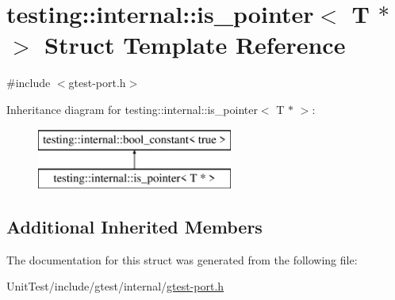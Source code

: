 \hypertarget{structtesting_1_1internal_1_1is__pointer_3_01_t_01_5_01_4}{\section{testing\+:\+:internal\+:\+:is\+\_\+pointer$<$ T $\ast$ $>$ Struct Template Reference}
\label{structtesting_1_1internal_1_1is__pointer_3_01_t_01_5_01_4}
}


{\ttfamily \#include $<$gtest-\/port.\+h$>$}

Inheritance diagram for testing\+:\+:internal\+:\+:is\+\_\+pointer$<$ T $\ast$ $>$\+:\begin{figure}[H]
\begin{center}
\leavevmode
\includegraphics[height=2.000000cm]{structtesting_1_1internal_1_1is__pointer_3_01_t_01_5_01_4}
\end{center}
\end{figure}
\subsection*{Additional Inherited Members}


The documentation for this struct was generated from the following file\+:\begin{DoxyCompactItemize}
\item 
Unit\+Test/include/gtest/internal/\hyperlink{gtest-port_8h}{gtest-\/port.\+h}\end{DoxyCompactItemize}
